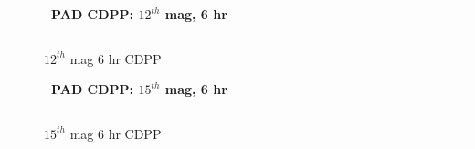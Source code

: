 \cleardoublepage
\begin{figure*}[h!]
  \centering
  \hfill
  {\Huge {\bf \quarter\ PAD CDPP: $12^{th}$ mag, 6 hr}}
  \hfill
\end{figure*}
\hrule
\begin{figure*}[h!]
  \centering
  \hfill
  \caption{$12^{th}$ mag 6 hr CDPP}
\end{figure*}

\cleardoublepage
\begin{figure*}[h!]
  \centering
  \hfill
  {\Huge {\bf \quarter\ PAD CDPP: $15^{th}$ mag, 6 hr}}
  \hfill
\end{figure*}
\hrule
\begin{figure*}[h!]
  \centering
  \hfill
  \caption{$15^{th}$ mag 6 hr CDPP}
\end{figure*}
